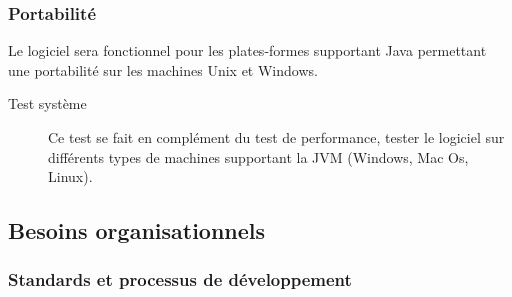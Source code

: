 \subsubsection{Portabilité}

Le logiciel sera fonctionnel pour les plates-formes supportant Java permettant une portabilité sur les machines Unix et Windows.

\begin{description}
\item[Test système] Ce test se fait en complément du test de performance, tester le logiciel sur différents types de machines supportant la JVM (Windows, Mac Os, Linux).
\end{description}

\subsection{Besoins organisationnels}

\subsubsection{Standards et processus de développement}

